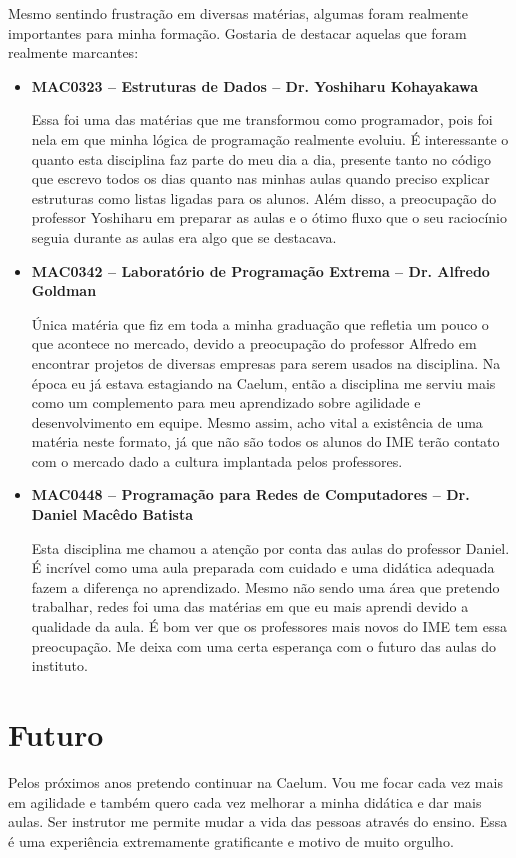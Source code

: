 \documentclass[titlepage,a4paper]{article}
\begin{document}
Mesmo sentindo frustração em diversas matérias, algumas foram realmente importantes para minha formação. Gostaria de destacar aquelas que foram realmente marcantes:

\begin{itemize}
	\item{\textbf{MAC0323 -- Estruturas de Dados -- Dr. Yoshiharu Kohayakawa} 

		Essa foi uma das matérias que me transformou como programador, pois foi nela em que minha lógica de programação realmente evoluiu. É interessante o quanto esta disciplina faz parte do meu dia a dia, presente tanto no código que escrevo todos os dias quanto nas minhas aulas quando preciso explicar estruturas como listas ligadas para os alunos. Além disso, a preocupação do professor Yoshiharu em preparar as aulas e o ótimo fluxo que o seu raciocínio seguia durante as aulas era algo que se destacava.}
	\item{\textbf{MAC0342 -- Laboratório de Programação Extrema -- Dr. Alfredo Goldman}

		Única matéria que fiz em toda a minha graduação que refletia um pouco o que acontece no mercado,  devido a preocupação do professor Alfredo em encontrar projetos de diversas empresas para serem usados na disciplina. Na época eu já estava estagiando na Caelum, então a disciplina me serviu mais como um complemento para meu aprendizado sobre agilidade e desenvolvimento em equipe. Mesmo assim, acho vital a existência de uma matéria neste formato, já que não são todos os alunos do IME terão contato com o mercado dado a cultura implantada pelos professores.}
	\item{\textbf{MAC0448 -- Programação para Redes de Computadores -- Dr. Daniel Macêdo Batista}

		Esta disciplina me chamou a atenção por conta das aulas do professor Daniel. É incrível como uma aula preparada com cuidado e uma didática adequada fazem a diferença no aprendizado. Mesmo não sendo uma área que pretendo trabalhar, redes foi uma das matérias em que eu mais aprendi devido a qualidade da aula. É bom ver que os professores mais novos do IME tem essa preocupação. Me deixa com uma certa esperança com o futuro das aulas do instituto.}
\end{itemize}

\section{Futuro}

Pelos próximos anos pretendo continuar na Caelum. Vou me focar cada vez mais em agilidade e também quero cada vez melhorar a minha didática e dar mais aulas. Ser instrutor me permite mudar a vida das pessoas através do ensino. Essa é uma experiência extremamente gratificante e motivo de muito orgulho.
\end{document}
